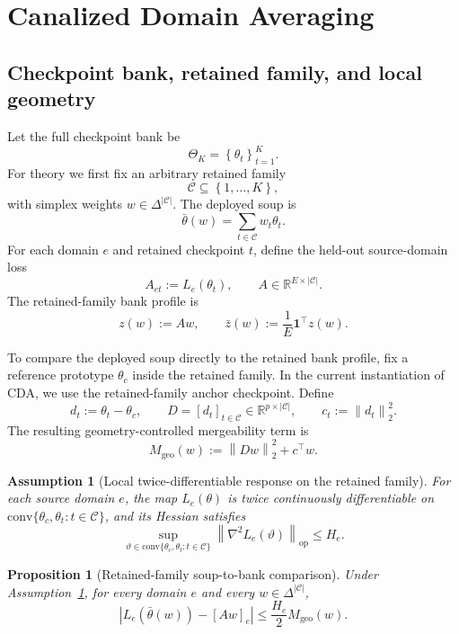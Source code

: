 \documentclass{article}
\newtheorem{proposition}[theorem]{Proposition}
\newtheorem{assumption}[theorem]{Assumption}
\theoremstyle{definition}
\newcommand{\RR}{\mathbb{R}}
\newcommand{\cC}{\mathcal{C}}
\newcommand{\cda}{\textup{\textsc{CDA}}}
\newcommand{\one}{\mathbf{1}}
\newcommand{\simplex}{\Delta}
\newcommand{\norm}[1]{\left\lVert #1 \right\rVert}
\newcommand{\abs}[1]{\left\lvert #1 \right\rvert}
\newcommand{\braces}[1]{\left\{ #1 \right\}}
\newcommand{\thetaw}{\bar{\theta}(w)}
\begin{document}
\section{Canalized Domain Averaging}
\label{sec:method}

\subsection{Checkpoint bank, retained family, and local geometry}

Let the full checkpoint bank be
\[
\Theta_K = \braces{\theta_t}_{t=1}^{K}.
\]
For theory we first fix an arbitrary retained family
\[
\cC \subseteq \braces{1,\dots,K},
\]
with simplex weights \(w \in \simplex^{|\cC|}\). The deployed soup is
\[
\thetaw = \sum_{t\in\cC} w_t \theta_t.
\]
For each domain \(e\) and retained checkpoint \(t\), define the held-out source-domain loss
\[
A_{et}:=L_e(\theta_t),
\qquad
A\in \RR^{E\times |\cC|}.
\]
The retained-family bank profile is
\[
z(w):=Aw,
\qquad
\bar z(w):=\frac{1}{E}\one^\top z(w).
\]

To compare the deployed soup directly to the retained bank profile, fix a reference prototype \(\theta_c\) inside the retained family. In the current instantiation of \cda{}, we use the retained-family anchor checkpoint. Define
\[
d_t:=\theta_t-\theta_c,
\qquad
D=[d_t]_{t\in\cC}\in\RR^{p\times |\cC|},
\qquad
c_t:=\norm{d_t}_2^2.
\]
The resulting geometry-controlled mergeability term is
\begin{equation}
M_{\mathrm{geo}}(w):=\norm{Dw}_2^2 + c^\top w.
\label{eq:geo_mergeability}
\end{equation}

\begin{assumption}[Local twice-differentiable response on the retained family]
\label{ass:smooth_family}
For each source domain \(e\), the map \(L_e(\theta)\) is twice continuously differentiable on \(\mathrm{conv}\{\theta_c,\theta_t:t\in\cC\}\), and its Hessian satisfies
\[
\sup_{\vartheta\in \mathrm{conv}\{\theta_c,\theta_t:t\in\cC\}}
\norm{\nabla^2 L_e(\vartheta)}_{\mathrm{op}}
\le H_e.
\]
\end{assumption}

\begin{proposition}[Retained-family soup-to-bank comparison]
\label{prop:bank_gap}
Under Assumption~\ref{ass:smooth_family}, for every domain \(e\) and every \(w\in\simplex^{|\cC|}\),
\begin{equation}
\abs{L_e(\thetaw)-[Aw]_e}
\le
\frac{H_e}{2}M_{\mathrm{geo}}(w).
\label{eq:bank_gap}
\end{equation}
\end{proposition}
\end{document}
